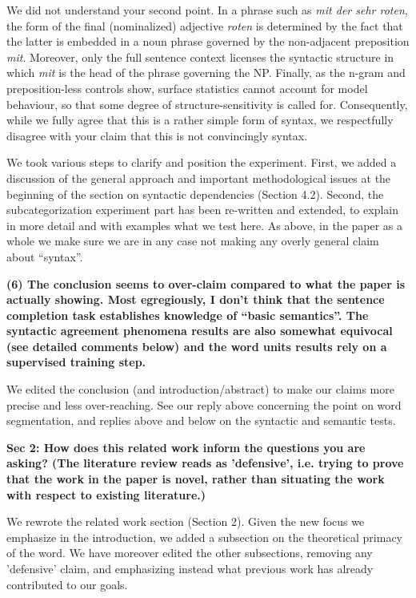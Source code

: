 \documentclass{article}[11pt,a4paper,oneside]
\begin{document}
We did not understand your second point. In a phrase such as \textit{mit der sehr roten}, the form of the final (nominalized) adjective \textit{roten} is determined by the fact that the latter is embedded in a noun phrase governed by the non-adjacent preposition \textit{mit}. Moreover, only the full sentence context licenses the syntactic structure in which \textit{mit} is the head of the phrase governing the NP. Finally, as the n-gram and preposition-less controls show, surface statistics cannot account for model behaviour, so that some degree of structure-sensitivity is called for. Consequently, while we fully agree that this is a rather simple form of syntax, we respectfully disagree with your claim that this is not convincingly syntax.

We took various steps to clarify and position the experiment. First, we added a discussion of the general approach and important methodological issues at the beginning of the section on syntactic dependencies (Section 4.2). Second, the subcategorization experiment part has been re-written and extended, to explain in more detail and with examples what we test here. As above, in the paper as a whole we make sure we are in any case not making any overly general claim about ``syntax''.
\newline

\textbf{(6) The conclusion seems to over-claim compared to what the paper is actually showing. Most egregiously, I don't think that the sentence completion task establishes knowledge of ``basic semantics''. The syntactic agreement phenomena results are also somewhat equivocal (see detailed comments below) and the word units results rely on a supervised training step.}

We edited the conclusion (and introduction/abstract) to make our claims more precise and less over-reaching. See our reply above concerning the point on word segmentation, and replies above and below on the syntactic and semantic tests.
\newline

\textbf{Sec 2: How does this related work inform the questions you are asking? (The literature review reads as 'defensive', i.e. trying to prove that the work in the paper is novel, rather than situating the work with respect to existing literature.)}

We rewrote the related work section (Section 2). Given the new focus we emphasize in the introduction, we added a subsection on the theoretical primacy of the word. We have moreover edited the other subsections, removing any 'defensive' claim, and emphasizing instead what previous work has already contributed to our goals.
\newline
\end{document}
